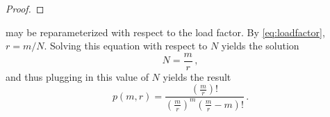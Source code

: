 \documentclass[ ../main.tex]{subfiles}
\begin{document}
\begin{proof}
\end{proof}

 may be reparameterized with respect to the load factor. By \cref{eq:loadfactor}, $r = m/N$. Solving this equation with respect to $N$ yields the solution
\begin{equation}
    N = \frac{m}{r}\,,
\end{equation}
and thus plugging in this value of $N$ yields the result
\begin{equation}
\label{eq:p_m_r}
    p(m,r) = \frac{\left(\frac{m}{r}\right)!}{\left(\frac{m}{r}\right)^m \left(\frac{m}{r}-m\right)!}\,.
\end{equation}
\end{document}

